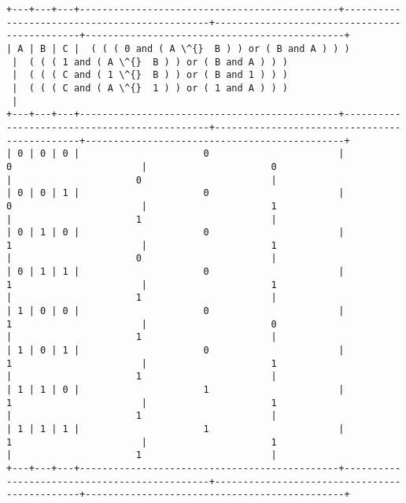 \documentclass[11pt]{article}
\begin{document}
    \begin{Verbatim}[commandchars=\\\{\}]
+---+---+---+----------------------------------------------+----------------------------------------------+----------------------------------------------+----------------------------------------------+
| A | B | C |  ( ( ( 0 and ( A \^{}  B ) ) or ( B and A ) ) )
 |  ( ( ( 1 and ( A \^{}  B ) ) or ( B and A ) ) )
 |  ( ( ( C and ( 1 \^{}  B ) ) or ( B and 1 ) ) )
 |  ( ( ( C and ( A \^{}  1 ) ) or ( 1 and A ) ) )
 |
+---+---+---+----------------------------------------------+----------------------------------------------+----------------------------------------------+----------------------------------------------+
| 0 | 0 | 0 |                      0                       |                      0                       |                      0                       |                      0                       |
| 0 | 0 | 1 |                      0                       |                      0                       |                      1                       |                      1                       |
| 0 | 1 | 0 |                      0                       |                      1                       |                      1                       |                      0                       |
| 0 | 1 | 1 |                      0                       |                      1                       |                      1                       |                      1                       |
| 1 | 0 | 0 |                      0                       |                      1                       |                      0                       |                      1                       |
| 1 | 0 | 1 |                      0                       |                      1                       |                      1                       |                      1                       |
| 1 | 1 | 0 |                      1                       |                      1                       |                      1                       |                      1                       |
| 1 | 1 | 1 |                      1                       |                      1                       |                      1                       |                      1                       |
+---+---+---+----------------------------------------------+----------------------------------------------+----------------------------------------------+----------------------------------------------+

    \end{Verbatim}
\end{document}
